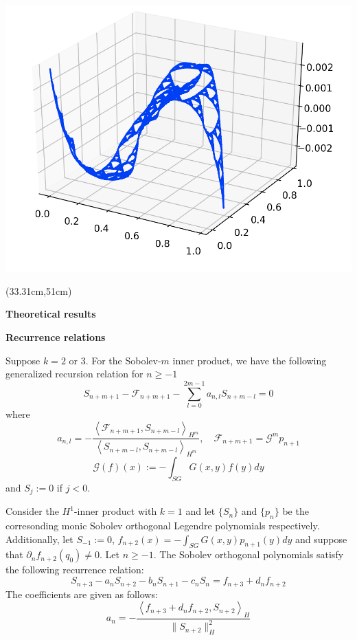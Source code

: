 \documentclass[a0, landscape]{a0poster}
\newcommand{\inner}[2]{\left \langle #1, #2\right \rangle}
\begin{document}
{\begin{textblock*}{22.5in}
\begin{minipage}{22.5in}
        \includegraphics[width=0.33\linewidth]{Final_presentation/images/chebyshev_p13_0_02750235.png}
    \end{minipage}
  \end{textblock*}%
}

{%
\begin{textblock*}{22.5in}(33.31cm,51cm)%
    \begin{minipage}{22.5in}
      \begin{center}
        {\LARGE \textcolor{CornellRed}{\textbf{Theoretical results}}}
      \end{center}
    \begin{multicols}{2}
    \begin{center}
        {\Large \textcolor{CornellRed}{\textbf{Recurrence relations}}}
      \end{center}
    \begin{theorem*}\label{th:gen_rec}
    Suppose $k=2$ or $3$. For the Sobolev-$m$ inner product, we have the following generalized recursion relation for $n\ge -1$
    $$S_{n+m+1} - \mathcal{F}_{n+m+1} - \sum\limits_{l = 0}^{2m-1}a_{n, l}S_{n+m-l} = 0$$
    where
    $$a_{n, l} = -\frac{\inner{\mathcal{F}_{n+m+1}}{S_{n+m-l}}_{H^m}}{\inner{S_{n+m-l}}{S_{n+m-l}}_{H^m}}, \quad \mathcal{F}_{n+m+1} = \mathcal{G}^mp_{n+1}$$
      $$ \mathcal{G}(f)(x) := -\int_{SG}G(x,y)f(y)dy$$
    and $S_j:=0$ if $j<0$.\end{theorem*}
    \begin{theorem*}\label{Recurrence Relation with one assumption $(k=1)$}
    Consider the $H^1$-inner product with $k=1$ and let $\{S_n\}$ and $\{p_n\}$ be the corresonding monic Sobolev orthogonal Legendre polynomials respectively. Additionally, let $S_{-1}:=0$, $f_{n+2}(x) = -\int_{SG}G(x,y)p_{n+1}(y)dy$ and suppose that $\partial_n f_{n+2}(q_0)\neq 0$. Let $n\geq-1$. The Sobolev orthogonal polynomials satisfy the following recurrence relation:
         $$S_{n+3}-a_nS_{n+2} - b_nS_{n+1}-c_nS_n = f_{n+3}+d_nf_{n+2}$$
        The coefficients are given as follows:
        $$ a_n=-\frac{\inner{f_{n+3}+d_nf_{n+2}}{S_{n+2}}_H}{\|S_{n+2}\|_H^2}$$

\end{theorem*}
\end{multicols}
\end{minipage}
\end{textblock*}}
\end{document}
